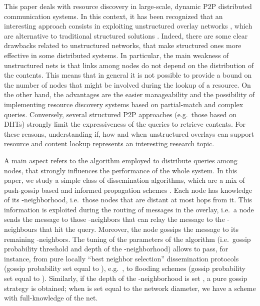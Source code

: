 \documentclass{sig-alternate}
\begin{document}
This paper deals with resource discovery in large-scale, dynamic \ac{P2P} distributed communication systems. In this context, it has been recognized that an interesting approach consists in exploiting unstructured overlay networks \cite{Cholvi:2004,simplex,Keidar:2006}, which are alternative to traditional structured solutions \cite{Hidalgo:2011}. 
Indeed, there are some clear drawbacks related to unstructured networks, that make structured ones more effective in some distributed systems. In particular, the main weakness of unstructured nets is that links among nodes do not depend on the distribution of the contents. 
This means that in general it is not possible to provide a bound on the number of nodes that might be involved during the lookup of a resource.
On the other hand, the advantages are the easier manageability and the possibility of implementing resource discovery systems based on partial-match and complex queries. Conversely, several structured P2P approaches (e.g.~those based on DHTs) strongly limit the expressiveness of the queries to retrieve contents. 
For these reasons, understanding if, how and when unstructured overlays can support resource and content lookup represents an interesting research topic.

A main aspect refers to the algorithm employed to distribute queries among nodes, that strongly influences the performance of the whole system.
In this paper, we study a simple class of dissemination algorithms, which are a mix of push-gossip based and informed propagation schemes \cite{disio11}. Each node has knowledge of its -neighborhood, i.e.~those nodes that are distant at most  hops from it. 
This information is exploited during the routing of messages in the overlay, i.e.~a node sends the message to those -neighbors that can relay the message to the -neighbours that hit the query. Moreover, the node gossips the message to its remaining -neighbors.
The tuning of the parameters of the algorithm (i.e.~gossip probability threshold and depth  of the -neighborhood) allows to pass, for instance, from pure locally ``best neighbor selection'' dissemination protocols (gossip probability set equal to ), e.g.~\cite{PuttaswamySZ08}, to flooding schemes (gossip probability set equal to ). Similarly, if the depth  of the -neighborhood is set , a pure gossip strategy is obtained; when  is set equal to the network diameter, we have a scheme with full-knowledge of the net.
\end{document}
